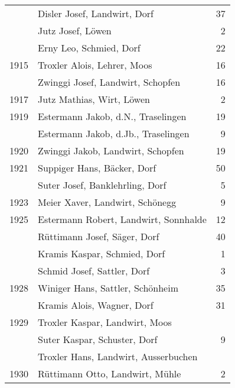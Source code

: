 {\begin{longtable}{ l l r }
                      & Disler Josef, Landwirt, Dorf              & 37          \\
                      & Jutz Josef, Löwen                         & 2           \\
                      & Erny Leo, Schmied, Dorf                   & 22          \\
        1915          & Troxler Alois, Lehrer, Moos               & 16          \\
                      & Zwinggi Josef, Landwirt, Schopfen         & 16          \\
        1917          & Jutz Mathias, Wirt, Löwen                 & 2           \\
        1919          & Estermann Jakob, d.N., Traselingen        & 19          \\
                      & Estermann Jakob, d.Jb., Traselingen       & 9           \\
        1920          & Zwinggi Jakob, Landwirt, Schopfen         & 19          \\
        1921          & Suppiger Hans, Bäcker, Dorf               & 50          \\
                      & Suter Josef, Banklehrling, Dorf           & 5           \\
        1923          & Meier Xaver, Landwirt, Schönegg           & 9           \\
        1925          & Estermann Robert, Landwirt, Sonnhalde     & 12          \\
                      & Rüttimann Josef, Säger, Dorf              & 40          \\
                      & Kramis Kaspar, Schmied, Dorf              & 1           \\
                      & Schmid Josef, Sattler, Dorf               & 3           \\
        1928          & Winiger Hans, Sattler, Schönheim          & 35          \\
                      & Kramis Alois, Wagner, Dorf                & 31          \\
        1929          & Troxler Kaspar, Landwirt, Moos            &             \\
                      & Suter Kaspar, Schuster, Dorf              & 9           \\
                      & Troxler Hans, Landwirt, Ausserbuchen      &             \\
        1930          & Rüttimann Otto, Landwirt, Mühle           & 2           \\

\end{longtable}}
